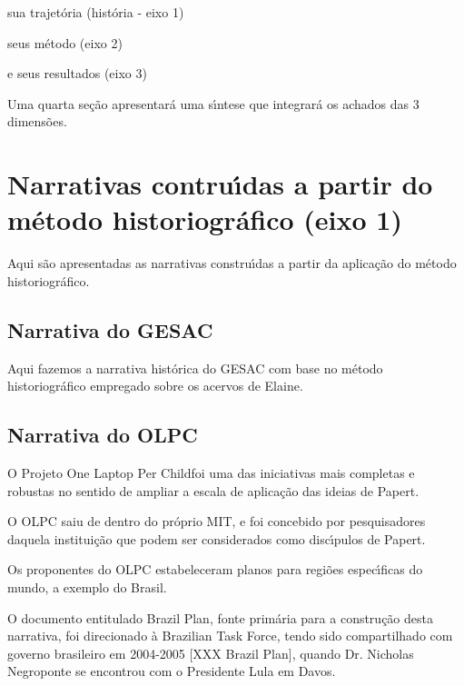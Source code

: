 \documentclass[
12pt,		%
openright,	%
twoside,  %
a4paper,			%
chapter=TITLE,		%
english,			%
french,				%
spanish,			%
brazil				%
]{USPSC-classe/USPSC}
\begin{document}
\begin{alineas}
\item sua trajet\'oria (hist\'oria - eixo 1)
\item seus m\'etodo (eixo 2)
\item e seus resultados (eixo 3)
\end{alineas}

Uma quarta se\c{c}\~ao apresentar\'a uma s\'{\i}ntese que integrar\'a os achados das 3 dimens\~oes.


\section[Narrativas contru\'{\i}das a partir do m\'etodo historiogr\'afico (eixo 1)]{Narrativas contru\'{\i}das a partir do m\'etodo historiogr\'afico (eixo 1)}\label{Narrativas contru\'{\i}das a partir do m\'etodo historiogr\'afico (eixo 1)}
Aqui s\~ao apresentadas as narrativas constru\'{\i}das a partir da aplica\c{c}\~ao do m\'etodo historiogr\'afico.


\subsection[Narrativa do GESAC]{Narrativa do GESAC}\label{Narrativa do GESAC}
Aqui fazemos a narrativa hist\'orica do GESAC com base no m\'etodo historiogr\'afico empregado sobre os acervos de Elaine.


\subsection[Narrativa do OLPC]{Narrativa do OLPC}\label{Narrativa do OLPC}
O Projeto \textquotedbl One Laptop Per Child foi uma das iniciativas mais completas e robustas no sentido de ampliar a escala de aplica\c{c}\~ao das ideias de Papert.


O OLPC saiu de dentro do pr\'oprio MIT, e foi concebido por pesquisadores daquela institui\c{c}\~ao que podem ser considerados como disc\'{\i}pulos de Papert.


Os proponentes do OLPC estabeleceram planos para regi\~oes espec\'{\i}ficas do mundo, a exemplo do Brasil.


O documento entitulado \textquotedbl Brazil Plan\textquotedbl , fonte prim\'aria para a constru\c{c}\~ao desta narrativa, foi direcionado \`a \textquotedbl Brazilian Task Force\textquotedbl , tendo sido compartilhado com governo brasileiro em 2004-2005 [XXX Brazil Plan], quando Dr. Nicholas Negroponte se encontrou com o Presidente Lula em Davos.
\end{document}
